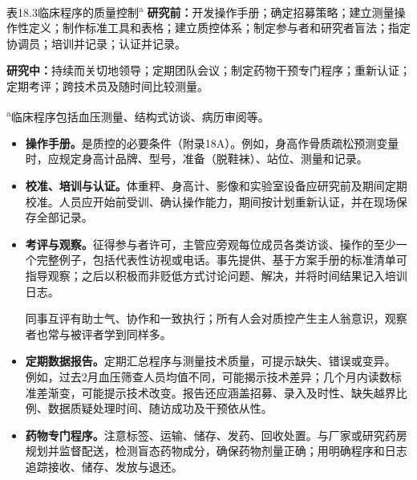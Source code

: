 \begin{bookbox}{表18.3\quad 临床程序的质量控制\textsuperscript{a}}
\textbf{研究前：}开发操作手册；确定招募策略；建立测量操作性定义；制作标准工具和表格；建立质控体系；制定参与者和研究者盲法；指定协调员；培训并记录；认证并记录。

\textbf{研究中：}持续而关切地领导；定期团队会议；制定药物干预专门程序；重新认证；定期考评；跨技术员及随时间比较测量。

\small\textsuperscript{a}临床程序包括血压测量、结构式访谈、病历审阅等。
\end{bookbox}
\begin{itemize}
\item \textbf{操作手册。}是质控的必要条件（附录18A）。例如，身高作骨质疏松预测变量时，应规定身高计品牌、型号，准备（脱鞋袜）、站位、测量和记录。
\item \textbf{校准、培训与认证。}体重秤、身高计、影像和实验室设备应研究前及期间定期校准。人员应开始前受训、确认操作能力，期间按计划重新认证，并在现场保存全部记录。
\item \textbf{考评与观察。}征得参与者许可，主管应旁观每位成员各类访谈、操作的至少一个完整例子，包括代表性访视或电话。事先提供、基于方案手册的标准清单可指导观察；之后以积极而非贬低方式讨论问题、解决，并将时间结果记入培训日志。

同事互评有助士气、协作和一致执行；所有人会对质控产生主人翁意识，观察者也常与被评者学到同样多。
\item \textbf{定期数据报告。}定期汇总程序与测量技术质量，可提示缺失、错误或变异。
例如，过去2月血压筛查人员均值不同，可能揭示技术差异；几个月内读数标准差渐变，可能提示技术改变。报告还应涵盖招募、录入及时性、缺失越界比例、数据质疑处理时间、随访成功及干预依从性。
\item \textbf{药物专门程序。}注意标签、运输、储存、发药、回收处置。与厂家或研究药房规划并监督配送，检测盲态药物成分，确保药物剂量正确；用明确程序和日志追踪接收、储存、发放与退还。
\end{itemize}

